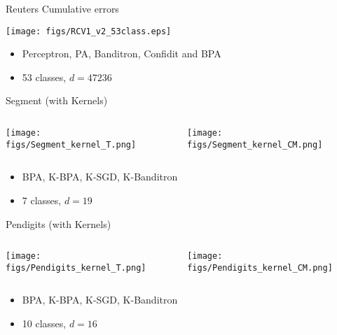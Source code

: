 \documentclass{beamer}
\begin{document}
\begin{frame}{Reuters Cumulative errors}
	

			\centerline{
				\texttt{[image: figs/RCV1\_v2\_53class.eps]}}
	
	
	\begin{footnotesize}
		\begin{itemize}
			\item Perceptron, PA, Banditron, Confidit and BPA
			\item 53 classes, $d = 47236$
		\end{itemize}
	\end{footnotesize}
	
\end{frame}

\begin{frame}{Segment (with Kernels)}
	\begin{columns}[t]
		\begin{column}{.5\linewidth}

	\texttt{[image: figs/Segment\_kernel\_T.png]}

		\end{column}
		\begin{column}{.5\linewidth}

		\texttt{[image: figs/Segment\_kernel\_CM.png]}


		\end{column}	
	\end{columns}
	
		\begin{footnotesize}
			\begin{itemize}
				\item BPA, K-BPA, K-SGD, K-Banditron
				\item 7 classes, $d = 19$
			\end{itemize}
		\end{footnotesize}
\end{frame}


\begin{frame}{Pendigits (with Kernels)}
	\begin{columns}[t]
		\begin{column}{.5\linewidth}
			\texttt{[image: figs/Pendigits\_kernel\_T.png]}			
		\end{column}
		\begin{column}{.5\linewidth}
				\texttt{[image: figs/Pendigits\_kernel\_CM.png]}
		\end{column}	
	\end{columns}
	\begin{footnotesize}
		\begin{itemize}
			\item BPA, K-BPA, K-SGD, K-Banditron
			\item 10 classes, $d = 16$
		\end{itemize}
	\end{footnotesize}
\end{frame}
\end{document}
